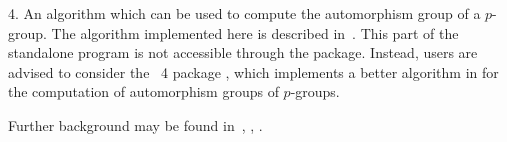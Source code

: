 \item{4.} 
An algorithm which can be used to compute the  automorphism  group  of  a
$p$-group. The algorithm implemented here is  described  in~\cite{OBr94}.
This part of  the  standalone  program  is  not  accessible  through  the
{\ANUPQ} package. Instead, users are advised  to  consider  the  {\GAP}~4
package {\AutPGrp}, which implements a better algorithm in {\GAP} for the
computation of automorphism groups of $p$-groups.

\endlist

Further   background   may   be   found   in~\cite{OBr95},   \cite{Vau84},
\cite{NNN98}.


